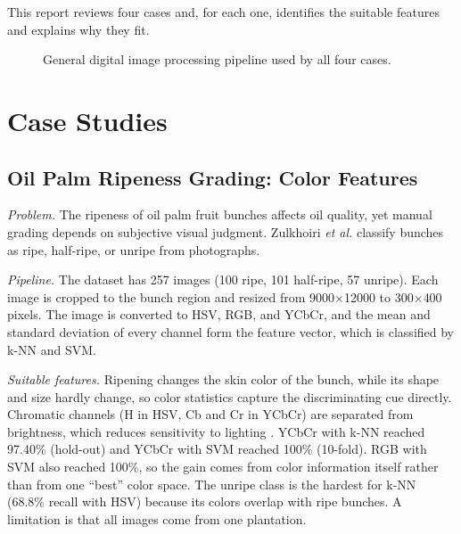 \documentclass[lettersize,journal]{IEEEtran}
\begin{document}
This report reviews four cases and, for each one, identifies the suitable features and explains why they fit.

\begin{figure}[!t]
\centering
{}
\caption{General digital image processing pipeline used by all four cases.}
\label{fig:pipeline}
\end{figure}

\section{Case Studies}

\subsection{Oil Palm Ripeness Grading: Color Features}
\textit{Problem.} The ripeness of oil palm fruit bunches affects oil quality, yet manual grading depends on subjective visual judgment. Zulkhoiri \textit{et al.} \cite{palm} classify bunches as ripe, half-ripe, or unripe from photographs.

\textit{Pipeline.} The dataset has 257 images (100 ripe, 101 half-ripe, 57 unripe). Each image is cropped to the bunch region and resized from 9000$\times$12000 to 300$\times$400 pixels. The image is converted to HSV, RGB, and YCbCr, and the mean and standard deviation of every channel form the feature vector, which is classified by k-NN and SVM.

\textit{Suitable features.} Ripening changes the skin color of the bunch, while its shape and size hardly change, so color statistics capture the discriminating cue directly. Chromatic channels (H in HSV, Cb and Cr in YCbCr) are separated from brightness, which reduces sensitivity to lighting \cite{palm}. YCbCr with k-NN reached 97.40\% (hold-out) and YCbCr with SVM reached 100\% (10-fold). RGB with SVM also reached 100\%, so the gain comes from color information itself rather than from one ``best'' color space. The unripe class is the hardest for k-NN (68.8\% recall with HSV) because its colors overlap with ripe bunches. A limitation is that all images come from one plantation.
\end{document}
